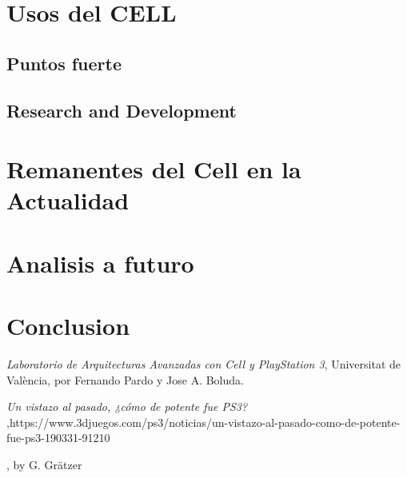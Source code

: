 \documentclass[11pt,compsoc]{IEEEtran}
\begin{document}
	
	
	\section{Usos del CELL}
	\noindent
	
	\subsection{Puntos fuerte}
	\noindent
	
	\subsection{Research and Development}
	\noindent
	
	
	
	\section{Remanentes del Cell en la Actualidad}
	\noindent 
	
	
	
	
	
	
	
	\section{Analisis a futuro}
	\noindent 
	
	
	
	
	
	
	\section{Conclusion}
	\noindent
	
	
		\begin{thebibliography}{1}
			
			{\it{Laboratorio de Arquitecturas Avanzadas con Cell y PlayStation 3}}, Universitat de València, por Fernando Pardo y Jose A. Boluda.
			
			{\it{Un vistazo al pasado, ¿cómo de potente fue PS3? }},https://www.3djuegos.com/ps3/noticias/un-vistazo-al-pasado-como-de-potente-fue-ps3-190331-91210
		
			, by G. Gr\"atzer
			

		\end{thebibliography}
	
		
\end{document}
